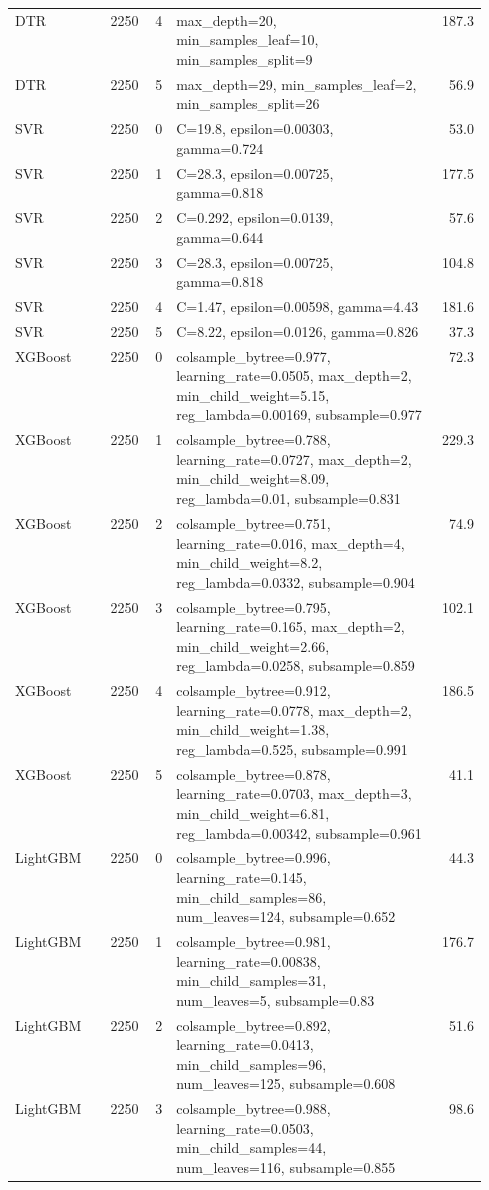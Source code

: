 \begin{longtable}{lrrp{0.55\linewidth}r}
DTR & 2250 & 4 & max\_depth=20, min\_samples\_leaf=10, min\_samples\_split=9 & 187.3 \\
DTR & 2250 & 5 & max\_depth=29, min\_samples\_leaf=2, min\_samples\_split=26 & 56.9 \\
SVR & 2250 & 0 & C=19.8, epsilon=0.00303, gamma=0.724 & 53.0 \\
SVR & 2250 & 1 & C=28.3, epsilon=0.00725, gamma=0.818 & 177.5 \\
SVR & 2250 & 2 & C=0.292, epsilon=0.0139, gamma=0.644 & 57.6 \\
SVR & 2250 & 3 & C=28.3, epsilon=0.00725, gamma=0.818 & 104.8 \\
SVR & 2250 & 4 & C=1.47, epsilon=0.00598, gamma=4.43 & 181.6 \\
SVR & 2250 & 5 & C=8.22, epsilon=0.0126, gamma=0.826 & 37.3 \\
XGBoost & 2250 & 0 & colsample\_bytree=0.977, learning\_rate=0.0505, max\_depth=2, min\_child\_weight=5.15, reg\_lambda=0.00169, subsample=0.977 & 72.3 \\
XGBoost & 2250 & 1 & colsample\_bytree=0.788, learning\_rate=0.0727, max\_depth=2, min\_child\_weight=8.09, reg\_lambda=0.01, subsample=0.831 & 229.3 \\
XGBoost & 2250 & 2 & colsample\_bytree=0.751, learning\_rate=0.016, max\_depth=4, min\_child\_weight=8.2, reg\_lambda=0.0332, subsample=0.904 & 74.9 \\
XGBoost & 2250 & 3 & colsample\_bytree=0.795, learning\_rate=0.165, max\_depth=2, min\_child\_weight=2.66, reg\_lambda=0.0258, subsample=0.859 & 102.1 \\
XGBoost & 2250 & 4 & colsample\_bytree=0.912, learning\_rate=0.0778, max\_depth=2, min\_child\_weight=1.38, reg\_lambda=0.525, subsample=0.991 & 186.5 \\
XGBoost & 2250 & 5 & colsample\_bytree=0.878, learning\_rate=0.0703, max\_depth=3, min\_child\_weight=6.81, reg\_lambda=0.00342, subsample=0.961 & 41.1 \\
LightGBM & 2250 & 0 & colsample\_bytree=0.996, learning\_rate=0.145, min\_child\_samples=86, num\_leaves=124, subsample=0.652 & 44.3 \\
LightGBM & 2250 & 1 & colsample\_bytree=0.981, learning\_rate=0.00838, min\_child\_samples=31, num\_leaves=5, subsample=0.83 & 176.7 \\
LightGBM & 2250 & 2 & colsample\_bytree=0.892, learning\_rate=0.0413, min\_child\_samples=96, num\_leaves=125, subsample=0.608 & 51.6 \\
LightGBM & 2250 & 3 & colsample\_bytree=0.988, learning\_rate=0.0503, min\_child\_samples=44, num\_leaves=116, subsample=0.855 & 98.6 \\

\end{longtable}
